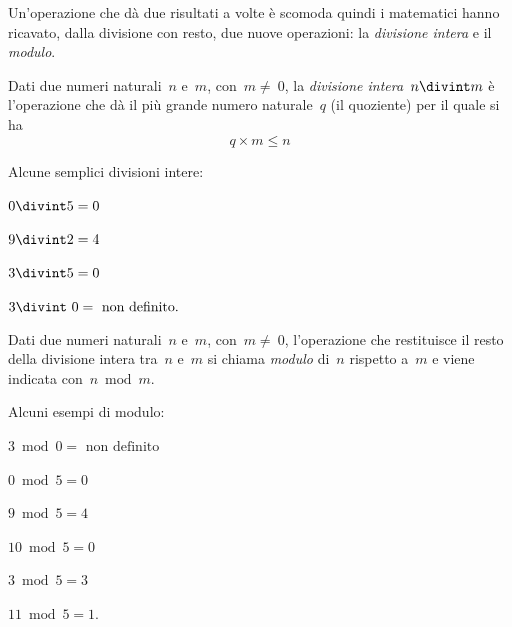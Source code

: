 Un'operazione che dà due risultati a volte è scomoda quindi i matematici 
hanno ricavato, dalla divisione con resto, due nuove operazioni: 
la \emph{divisione intera} e il \emph{modulo}.

\begin{definizione}
 Dati due numeri naturali~\(n\) e~\(m\), con~\(m\neq~0\), la 
 \emph{divisione intera}~\(n\divint m\) è l'operazione che dà il più grande 
 numero naturale~\(q\) (il quoziente) per il quale si ha
\[q\times m\le n\]
\end{definizione}

\newpage

\begin{exrig}
 \begin{esempio}
 Alcune semplici divisioni intere:
 
\begin{multicols}{2}
\(0 \divint 5=0\)

\(9 \divint 2=4\)

\(3\divint 5=0\)

\(3\divint~0=\text{ non definito.}\)
\end{multicols}

 \end{esempio}
\end{exrig}

\begin{definizione}
 Dati due numeri naturali~\(n\) e~\(m\), con~\(m\neq~0\), l'operazione che 
 restituisce il resto della divisione intera tra~\(n\) e~\(m\) si chiama 
 \emph{modulo} di~\(n\) rispetto a~\(m\) e viene indicata con~\(n\bmod{m}\).
\end{definizione}

\begin{exrig}
 \begin{esempio}
 Alcuni esempi di modulo:
 
\begin{multicols}{3}
\(3 \bmod 0= \text{ non definito}\)

\(0 \bmod 5= 0\)

\(9 \bmod 5 = 4\)

\(10 \bmod 5 = 0\)

\(3 \bmod 5 = 3\)

\(11 \bmod 5 = 1\).
\end{multicols}

 \end{esempio}
\end{exrig}


